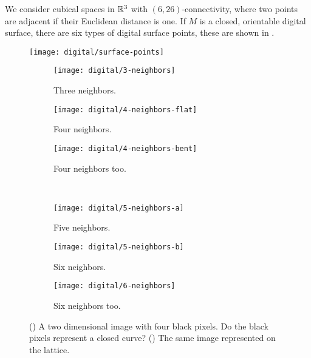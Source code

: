 We consider cubical spaces in $\mathbb{R}^3$ with $(6,26)$-connectivity,
where two points are adjacent if their Euclidean distance is one.
If $M$ is a closed, orientable digital surface, there are
six types of digital surface points, these are shown in .

\begin{figure}[htb]
        \centering
        \texttt{[image: digital/surface-points]}
		\caption{
		\label{fig:surface-points}}
\end{figure}


\begin{figure}[htb]
        \centering
        \begin{subfigure}[b]{0.2\textwidth}
        \texttt{[image: digital/3-neighbors]}
        \caption{Three neighbors.}
          \label{fig:3-neighbors}
        \end{subfigure}
          \hspace{.3cm}
         \begin{subfigure}[b]{0.25\textwidth}
        \texttt{[image: digital/4-neighbors-flat]}
        \caption{Four neighbors.}
        \label{fig:4-neighbors-flat}
        \end{subfigure}
         \hspace{.3cm}
         \begin{subfigure}[b]{0.2\textwidth}
        \texttt{[image: digital/4-neighbors-bent]}
        \caption{Four neighbors too.}
        \label{fig:4-neighbors-bent}
        \end{subfigure}\\
         \begin{subfigure}[b]{0.25\textwidth}
        \texttt{[image: digital/5-neighbors-a]}
        \caption{Five neighbors.}
          \label{fig:1-neighbors}
        \end{subfigure}
          \hspace{.2cm}
         \begin{subfigure}[b]{0.25\textwidth}
        \texttt{[image: digital/5-neighbors-b]}
        \caption{Six neighbors.}
        \label{fig:4-neighbors-flat}
        \end{subfigure}
         \hspace{.2cm}
         \begin{subfigure}[b]{0.25\textwidth}
        \texttt{[image: digital/6-neighbors]}
        \caption{Six neighbors too.}
        \label{fig:6-neighbors}
        \end{subfigure}
		\caption{() A two dimensional image with four black pixels.
		Do the black pixels represent a closed curve? () The same image
		represented on the lattice.
		\label{fig:4-square-and-dual}}
\end{figure}

